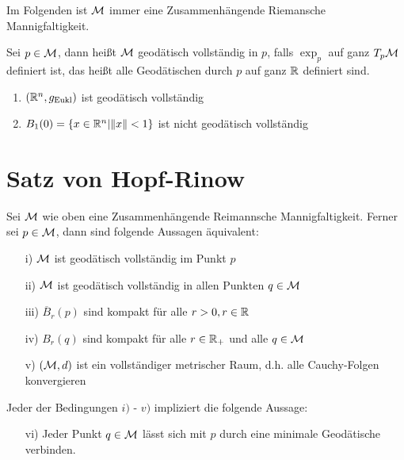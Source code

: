 
Im Folgenden ist $\mathcal{M}$ immer eine Zusammenhängende Riemansche Mannigfaltigkeit.

\begin{defs}
    Sei $p \in \mathcal{M}$, dann heißt $\mathcal{M}$ geodätisch vollständig in $p$, falls $\exp_p$ auf ganz $T_p \mathcal{M}$ definiert ist,
    das heißt alle Geodätischen durch $p$ auf ganz $\mathbb{R}$ definiert sind.
\end{defs}

\begin{bsp}
    \label{bsp:geodvollstaendig}
    \begin{enumerate}
        \item $(\mathbb{R}^n, g_{\text{Eukl}})$ ist geodätisch vollständig
        \item $B_1 (0) = \{ x \in \mathbb{R}^n \vert \norm{x} < 1 \}$ ist nicht geodätisch vollständig
    \end{enumerate}
\end{bsp}

\section{Satz von Hopf-Rinow}

\begin{satz}
    \label{satz:hopfrinow}   
    Sei $\mathcal{M}$ wie oben eine Zusammenhängende Reimannsche Mannigfaltigkeit. 
    Ferner sei $p \in \mathcal{M}$, dann sind folgende Aussagen äquivalent:
    \begin{itemize}
    \item[i)] $\mathcal{M}$ ist geodätisch vollständig im Punkt $p$
    \item[ii)] $\mathcal{M}$ ist geodätisch vollständig in allen Punkten $q \in \mathcal{M}$
    \item[iii)] $\overline{B}_r (p)$ sind kompakt für alle $r > 0, r \in \mathbb{R}$
    \item[iv)] $B_r (q)$  sind kompakt für alle $r \in \mathbb{R}_+$ und alle $ q \in \mathcal{M}$
    \item[v)] $(\mathcal{M}, d)$ ist ein vollständiger metrischer Raum, d.h. alle Cauchy-Folgen konvergieren
    \end{itemize}
    Jeder der Bedingungen $i)$ - $v)$ impliziert die folgende Aussage:
    \begin{itemize}
    \item[vi)] Jeder Punkt $q \in \mathcal{M}$ lässt sich mit $p$ durch eine minimale Geodätische verbinden.
    \end{itemize}
\end{satz}

